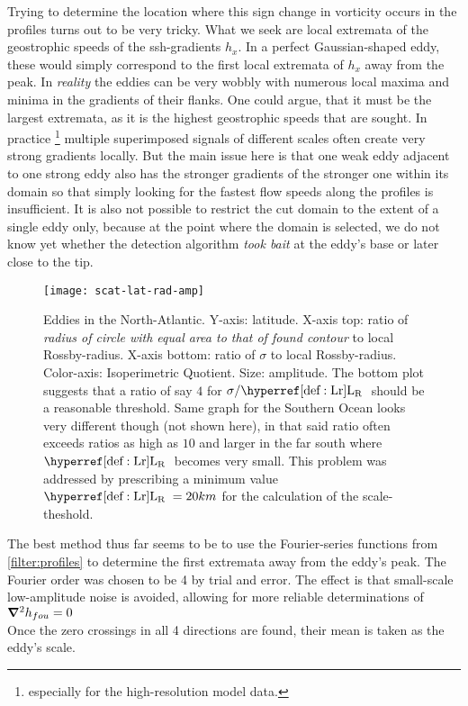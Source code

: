 Trying to determine the location where this sign change in vorticity occurs in the profiles turns out to be very tricky. What we seek are local extremata of the geostrophic speeds \ie of the ssh-gradients $h_x$. In a perfect Gaussian-shaped eddy, these would simply correspond to the first local extremata of $h_x$ away from the peak. In \textit{reality} the eddies can be very wobbly with numerous local maxima and minima in the gradients of their flanks. One could argue, that it must be the largest extremata, as it is the highest geostrophic speeds that are sought. In practice \footnote{especially for the high-resolution model data.} multiple superimposed signals of different scales often create very strong gradients locally. But the main issue here is that one weak eddy adjacent to one strong eddy also has the stronger gradients of the stronger one within its domain so that simply looking for the fastest flow speeds along the profiles is insufficient. It is also not possible to restrict the cut domain to the extent of a single eddy only, because at the point where the domain is selected, we do not know yet whether the detection algorithm \textit{took bait} at the eddy's base or later close to the tip. \\
\begin{wrapfigure}{r}{0.4\textwidth}
	\texttt{[image: scat-lat-rad-amp]}
	\caption{Eddies in the North-Atlantic. Y-axis: latitude. X-axis top: ratio of \textit{radius of circle with equal area to that of found contour} to local Rossby-radius.  X-axis bottom: ratio of $\sigma$ to local Rossby-radius. Color-axis: Isoperimetric Quotient. Size: amplitude. The bottom plot suggests that a ratio of say $4$ for $\sigma/\Lr$ should be a reasonable threshold. Same graph for the Southern Ocean looks very different though (not shown here), in that said ratio often exceeds ratios as high as $10$ and larger in the far south where $\Lr$ becomes very small. This problem was addressed by prescribing a minimum value $\Lr=20km$ for the calculation of the scale-theshold.   }
	\label{fig:scat-lat-rad-amp}
\end{wrapfigure}
The best method thus far seems to be to use the Fourier-series functions from \ref{filter:profiles} to determine the first extremata away from the eddy's peak. The Fourier order was chosen to be 4 by trial and error. The effect is that small-scale low-amplitude noise is avoided, allowing for more reliable determinations of $\mathbf{\bm{\nabla}}^2 h_{fou} = 0$       \\
 Once the zero crossings in all 4 directions are found, their mean is taken as the eddy's scale.
